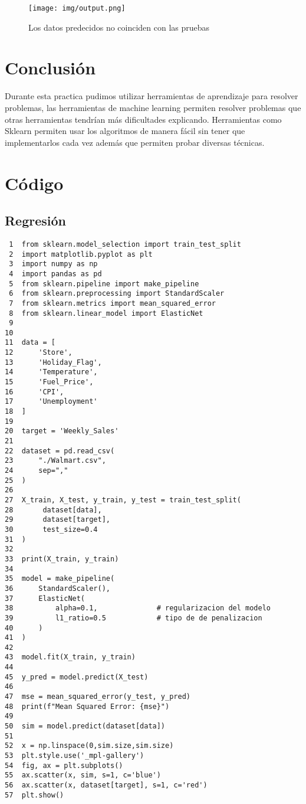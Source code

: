 \documentclass[11pt]{article}
\begin{document}
\begin{figure}[htbp]
\centering
\texttt{[image: img/output.png]}
\caption{Los datos predecidos no coinciden con las pruebas}
\end{figure}

\section{Conclusión}
\label{sec:orgce250e4}
Durante esta practica pudimos utilizar herramientas de aprendizaje
para resolver problemas, las herramientas de machine learning permiten
resolver problemas que otras herramientas tendrían más dificultades
explicando. Herramientas como Sklearn permiten usar los algoritmos de
manera fácil sin tener que implementarlos cada vez además que
permiten probar diversas técnicas.


\section{Código}
\label{sec:orgfefbb03}
\subsection{Regresión}
\label{sec:org3da056c}
\begin{verbatim}
 1  from sklearn.model_selection import train_test_split     
 2  import matplotlib.pyplot as plt
 3  import numpy as np
 4  import pandas as pd
 5  from sklearn.pipeline import make_pipeline
 6  from sklearn.preprocessing import StandardScaler
 7  from sklearn.metrics import mean_squared_error
 8  from sklearn.linear_model import ElasticNet
 9  
10  
11  data = [
12      'Store',
13      'Holiday_Flag',
14      'Temperature',
15      'Fuel_Price',
16      'CPI',
17      'Unemployment'
18  ]
19  
20  target = 'Weekly_Sales'
21  
22  dataset = pd.read_csv(
23      "./Walmart.csv",
24      sep=","
25  )
26  
27  X_train, X_test, y_train, y_test = train_test_split(
28       dataset[data], 
29       dataset[target], 
30       test_size=0.4
31  )
32  
33  print(X_train, y_train)
34  
35  model = make_pipeline(
36      StandardScaler(),
37      ElasticNet(
38          alpha=0.1,              # regularizacion del modelo
39          l1_ratio=0.5            # tipo de de penalizacion
40      )
41  )
42  
43  model.fit(X_train, y_train)
44  
45  y_pred = model.predict(X_test)
46  
47  mse = mean_squared_error(y_test, y_pred)
48  print(f"Mean Squared Error: {mse}")
49  
50  sim = model.predict(dataset[data])
51  
52  x = np.linspace(0,sim.size,sim.size)
53  plt.style.use('_mpl-gallery')
54  fig, ax = plt.subplots()
55  ax.scatter(x, sim, s=1, c='blue')
56  ax.scatter(x, dataset[target], s=1, c='red')
57  plt.show()
\end{verbatim}
\end{document}
